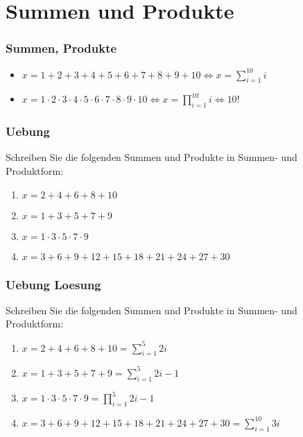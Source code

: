 \section{Summen und Produkte}
\begin{frame}
    \frametitle{Summen, Produkte}
    \begin{itemize}
        \vfill \item $x = 1+2+3+4+5+6+7+8+9+10 \iff x = \sum_{i=1}^{10} i$
        \vfill \item $x = 1 \cdot 2 \cdot 3 \cdot 4 \cdot 5 \cdot 6 \cdot 7 \cdot 8 \cdot 9 \cdot 10 \iff x = \prod_{i=1}^{10} i \iff 10!$
    \end{itemize}
\end{frame}

\begin{frame}
    \frametitle{Uebung}
    Schreiben Sie die folgenden Summen und Produkte in Summen- und Produktform:
    \begin{enumerate}
        \vfill \item $x = 2+4+6+8+10$
        \vfill \item $x = 1+3+5+7+9$
        \vfill \item $x = 1 \cdot 3 \cdot 5 \cdot 7 \cdot 9$
        \vfill \item $x = 3+6+9+12+15+18+21+24+27+30$
    \end{enumerate}
\end{frame}

\begin{frame}
    \frametitle{Uebung Loesung}
    Schreiben Sie die folgenden Summen und Produkte in Summen- und Produktform:
    \begin{enumerate}
        \vfill \item $x = 2+4+6+8+10 = \sum_{i=1}^{5} 2i$
        \vfill \item $x = 1+3+5+7+9 = \sum_{i=1}^{5} 2i-1$
        \vfill \item $x = 1 \cdot 3 \cdot 5 \cdot 7 \cdot 9 = \prod_{i=1}^{5} 2i-1$
        \vfill \item $x = 3+6+9+12+15+18+21+24+27+30 = \sum_{i=1}^{10} 3i$
    \end{enumerate}
\end{frame}
